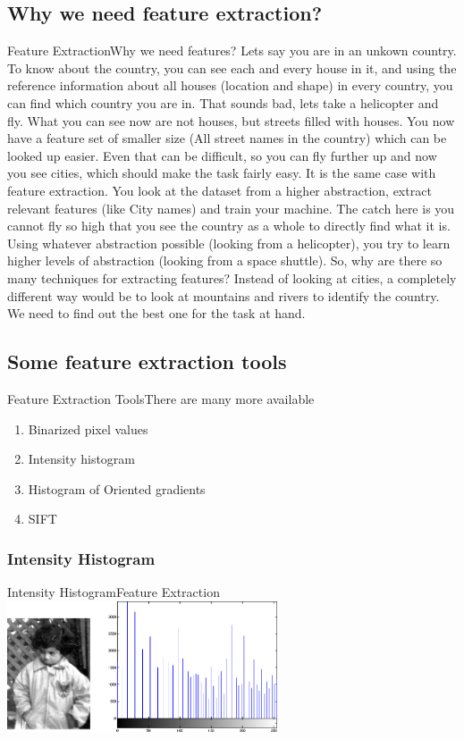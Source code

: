 \documentclass{beamer}
\begin{document}
\subsection{Why we need feature extraction?}
\begin{frame}{Feature Extraction}{Why we need features?}
Lets say you are in an unkown country. 
To know about the country, you can see each and every house in it, and using the reference information about all houses (location and shape) in every country, you can find which country you are in.
That sounds bad, lets take a helicopter and fly. What you can see now are not houses, but streets filled with houses.
You now have a feature set of smaller size (All street names in the country) which can be looked up easier.
Even that can be difficult, so you can fly further up and now you see cities, which should make the task fairly easy.
It is the same case with feature extraction. You look at the dataset from a higher abstraction, extract relevant features (like City names) and train your machine.
The catch here is you cannot fly so high that you see the country as a whole to directly find what it is. Using whatever abstraction possible (looking from a helicopter), you try to learn higher levels of abstraction (looking from a space shuttle).
So, why are there so many techniques for extracting features?
Instead of looking at cities, a completely different way would be to look at mountains and rivers to identify the country. We need to find out the best one for the task at hand.
\end{frame}

\subsection{Some feature extraction tools}
\begin{frame}{Feature Extraction Tools}{There are many more available}
\begin{enumerate}
\item Binarized pixel values
\item Intensity histogram 
\item Histogram of Oriented gradients
\item SIFT
\end{enumerate}
\end{frame}

\subsubsection{Intensity Histogram}
\begin{frame}{Intensity Histogram}{Feature Extraction}
\centering
    \includegraphics[width=80mm]{images/intensity.png}

\end{frame}
\end{document}
